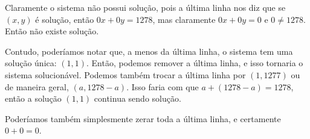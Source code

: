 \documentclass[a4paper,12pt]{article}
\newenvironment{sol}{\begin{tcolorbox}[breakable,colback=blue!5!white,colframe=blue!40!white,title=\normalsize {\sc{Solução}},coltitle=black]}{\end{tcolorbox}}
\begin{document}
\begin{sol}
	Claramente o sistema não possui solução, pois a última linha nos diz que se $(x,y)$ é solução, então $0x+0y=1278$, mas claramente $0x+0y=0$ e $0\neq 1278$. Então não existe solução.
	
	Contudo, poderíamos notar que, a menos da última linha, o sistema tem uma solução única: $(1,1)$. Então, podemos remover a última linha, e isso tornaria o sistema solucionável. Podemos também trocar a última linha por $(1,1277)$ ou de maneira geral, $(a,1278-a)$. Isso faria com que $a+(1278-a)=1278$, então a solução $(1,1)$ continua sendo solução.
	
	Poderíamos também simplesmente zerar toda a última linha, e certamente $0+0=0$.
\end{sol}
\end{document}
